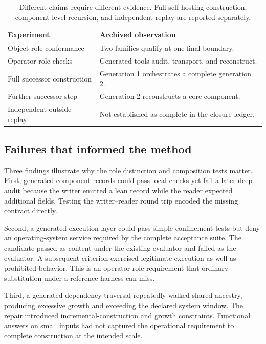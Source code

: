 \documentclass[10pt,twocolumn,letterpaper]{article}
\begin{document}
\begin{table}[t]
\centering\small
\begin{tabular}{@{}p{}p{}@{}}
\toprule
Experiment & Archived observation\\
\midrule
Object-role conformance & Two families qualify at one final boundary.\\[3pt]
Operator-role checks & Generated tools audit, transport, and reconstruct.\\[3pt]
Full successor construction & Generation 1 orchestrates a complete generation 2.\\[3pt]
Further successor step & Generation 2 reconstructs a core component.\\[3pt]
Independent outside replay & Not established as complete in the closure ledger.\\
\bottomrule
\end{tabular}
\caption{Different claims require different evidence. Full self-hosting construction, component-level recursion, and independent replay are reported separately.}
\label{tab:roles}
\end{table}

\subsection{Failures that informed the method}
Three findings illustrate why the role distinction and composition tests matter. First, generated component records could pass local checks yet fail a later deep audit because the writer emitted a lean record while the reader expected additional fields. Testing the writer--reader round trip encoded the missing contract directly.

Second, a generated execution layer could pass simple confinement tests but deny an operating-system service required by the complete acceptance suite. The candidate passed as content under the existing evaluator and failed as the evaluator. A subsequent criterion exercised legitimate execution as well as prohibited behavior. This is an operator-role requirement that ordinary substitution under a reference harness can miss.

Third, a generated dependency traversal repeatedly walked shared ancestry, producing excessive growth and exceeding the declared system window. The repair introduced incremental-construction and growth constraints. Functional answers on small inputs had not captured the operational requirement to complete construction at the intended scale.
\end{document}
